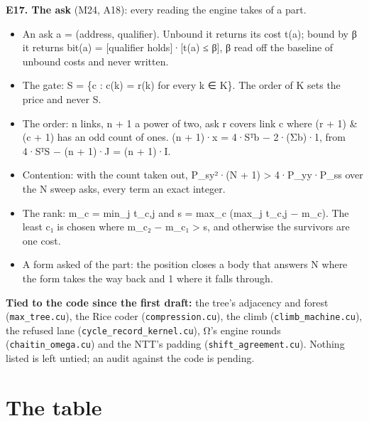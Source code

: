 \textbf{E17. The ask} (M24, A18): every reading the engine takes of a part.

\begin{itemize}
\item An ask a = (address, qualifier). Unbound it returns its cost t(a); bound by β it returns bit(a) = [qualifier holds]·[t(a) ≤ β], β read off the baseline of unbound costs and never written.
\item The gate: S = \{c : c(k) = r(k) for every k ∈ K\}. The order of K sets the price and never S.
\item The order: n links, n + 1 a power of two, ask r covers link c where (r + 1) \& (c + 1) has an odd count of ones. (n + 1)·x = 4·Sᵀb − 2·(Σb)·1, from 4·SᵀS − (n + 1)·J = (n + 1)·I.
\item Contention: with the count taken out, P\_\allowbreak{}sy²·(N + 1) > 4·P\_\allowbreak{}yy·P\_\allowbreak{}ss over the N sweep asks, every term an exact integer.
\item The rank: m\_\allowbreak{}c = min\_\allowbreak{}j t\_\allowbreak{}c,j and s = max\_\allowbreak{}c (max\_\allowbreak{}j t\_\allowbreak{}c,j − m\_\allowbreak{}c). The least c₁ is chosen where m\_\allowbreak{}c₂ − m\_\allowbreak{}c₁ > s, and otherwise the survivors are one cost.
\item A form asked of the part: the position closes a body that answers N where the form takes the way back and 1 where it falls through.
\end{itemize}

\textbf{Tied to the code since the first draft:} the tree's adjacency and forest (\texttt{max\_\allowbreak{}tree.\allowbreak{}cu}), the Rice coder (\texttt{compression.\allowbreak{}cu}), the climb (\texttt{climb\_\allowbreak{}machine.\allowbreak{}cu}), the refused lane (\texttt{cycle\_\allowbreak{}record\_\allowbreak{}kernel.\allowbreak{}cu}), Ω's engine rounds (\texttt{chaitin\_\allowbreak{}omega.\allowbreak{}cu}) and the NTT's padding (\texttt{shift\_\allowbreak{}agreement.\allowbreak{}cu}). Nothing listed is left untied; an audit against the code is pending.

\section{\texorpdfstring{The table}{The table}}

